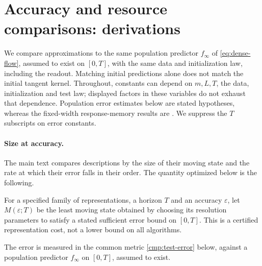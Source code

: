 \section{Accuracy and resource comparisons: derivations}
\label{app:comparison}
\label{app:size}

We compare approximations to the same population predictor $f_\infty$ of
\eqref{eq:dense-flow}, assumed to exist on $[0,T]$, with the same data and
initialization law, including the readout.  Matching initial predictions alone
does not match the initial tangent kernel.  Throughout, constants can depend
on $m,L,T$, the data, initialization and test law; displayed factors in these
variables do not exhaust that dependence.  Population error estimates below
are stated hypotheses, whereas the fixed-width response-memory results are
.  We suppress the $T$ subscripts on error constants.

\paragraph{Size at accuracy.}
The main text compares descriptions by the size of their moving state and the
rate at which their error falls in their order.  The quantity optimized below
is the following.
\begin{definition}
\label{def:size}
For a specified family of representations, a horizon $T$ and an accuracy
$\varepsilon$, let $M(\varepsilon;T)$ be the least moving state obtained by
choosing its resolution parameters to satisfy a stated sufficient error bound
on $[0,T]$.  This is a certified representation cost, not a lower bound on
all algorithms.
\end{definition}
The error is measured in the common metric \eqref{cmp:test-error} below,
against a population predictor $f_\infty$ on $[0,T]$, assumed to exist.

